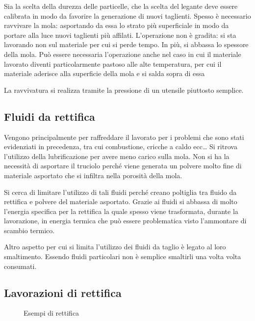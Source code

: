 Sia la scelta della durezza delle particelle, che la scelta del legante deve essere calibrata in modo da favorire la generazione di nuovi taglienti.
Spesso è necessario ravvivare la mola: asportando da essa lo strato più superficiale in modo da portare alla luce nuovi taglienti più affilati.
L'operazione non è gradita: si sta lavorando non sul materiale per cui si perde tempo. In più, si abbassa lo spessore della mola.
Può essere necessaria l'operazione anche nel caso in cui il materiale lavorato diventi particolarmente pastoso alle alte temperatura, per cui il materiale aderisce alla superficie della mola e si salda sopra di essa

La ravvivatura si realizza tramite la pressione di un utensile piuttosto semplice.

\subsection{Fluidi da rettifica}
Vengono principalmente per raffreddare il lavorato per i problemi che sono stati evidenziati in precedenza, tra cui combustione, cricche a caldo ecc\dots
Si ritrova l'utilizzo della lubrificazione per avere meno carico sulla mola.
Non si ha la necessità di asportare il truciolo perché viene generata un polvere molto fine di materiale asportato che si infiltra nella porosità della mola.

Si cerca di limitare l'utilizzo di tali fluidi perché creano poltiglia tra fluido da rettifica e polvere del materiale asportato.
Grazie ai fluidi si abbassa di molto l'energia specifica per la rettifica la quale spesso viene trasformata, durante la lavorazione, in energia termica che può essere problematica visto l'ammontare di scambio termico.

Altro aspetto per cui si limita l'utilizzo dei fluidi da taglio è legato al loro smaltimento. Essendo fluidi particolari non è semplice smaltirli una volta volta consumati.

\subsection{Lavorazioni di rettifica}
\begin{figure}
\centering
{}\quad
{}\quad
{}
\caption{Esempi di rettifica}
\label{fig:Rettifica}
\end{figure}

